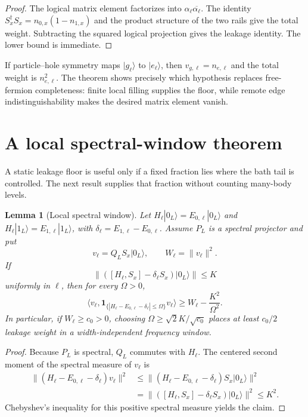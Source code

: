 \documentclass[11pt,a4paper]{article}
\newtheorem{lemma}[theorem]{Lemma}
\theoremstyle{remark}
\begin{document}
\begin{proof}
The logical matrix element factorizes into $\alpha_\ell\overline{\alpha_\ell}$.  The identity $S_x^\dagger S_x=n_{0,x}(1-n_{1,x})$ and the product structure of the two rails give the total weight.  Subtracting the squared logical projection gives the leakage identity.  The lower bound is immediate.
\end{proof}

If particle--hole symmetry maps $|g_\ell\rangle$ to $|e_\ell\rangle$, then $v_{g,\ell}=n_{e,\ell}$ and the total weight is $n_{e,\ell}^2$.  The theorem shows precisely which hypothesis replaces free-fermion completeness: finite local filling supplies the floor, while remote edge indistinguishability makes the desired matrix element vanish.

\section{A local spectral-window theorem}

A static leakage floor is useful only if a fixed fraction lies where the bath tail is controlled.  The next result supplies that fraction without counting many-body levels.

\begin{lemma}[Local spectral window]\label{lem:spectralwindow}
Let $H_\ell|0_L\rangle=E_{0,\ell}|0_L\rangle$ and $H_\ell|1_L\rangle=E_{1,\ell}|1_L\rangle$, with $\delta_\ell=E_{1,\ell}-E_{0,\ell}$.  Assume $P_L$ is a spectral projector and put
\[
 v_\ell=Q_LS_x|0_L\rangle,
 \qquad W_\ell=\|v_\ell\|^2.
\]
If
\[
 \|([H_\ell,S_x]-\delta_\ell S_x)|0_L\rangle\|\le K
\]
uniformly in $\ell$, then for every $\Omega>0$,
\[
 \langle v_\ell,
 \mathbf1_{\{|H_\ell-E_{0,\ell}-\delta_\ell|\le\Omega\}}v_\ell\rangle
 \ge W_\ell-\frac{K^2}{\Omega^2}.
\]
In particular, if $W_\ell\ge c_0>0$, choosing $\Omega\ge\sqrt{2}K/\sqrt{c_0}$ places at least $c_0/2$ leakage weight in a width-independent frequency window.
\end{lemma}

\begin{proof}
Because $P_L$ is spectral, $Q_L$ commutes with $H_\ell$.  The centered second moment of the spectral measure of $v_\ell$ is
\begin{align*}
 \|(H_\ell-E_{0,\ell}-\delta_\ell)v_\ell\|^2
 &\le\|(H_\ell-E_{0,\ell}-\delta_\ell)S_x|0_L\rangle\|^2\\
 &=\|([H_\ell,S_x]-\delta_\ell S_x)|0_L\rangle\|^2\le K^2.
\end{align*}
Chebyshev's inequality for this positive spectral measure yields the claim.
\end{proof}
\end{document}
